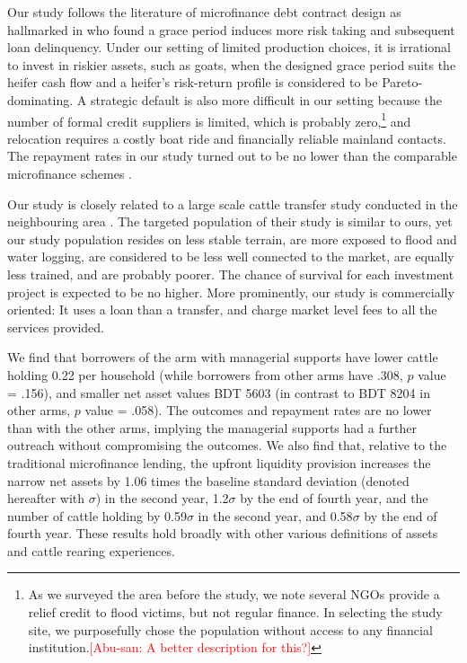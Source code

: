 	Our study follows the literature of microfinance debt contract design as hallmarked in \citet{Field2013} who found a grace period induces more risk taking and subsequent loan delinquency. Under our setting of limited production choices, it is irrational to invest in riskier assets, such as goats, when the designed grace period suits the heifer cash flow and a heifer's risk-return profile is considered to be Pareto-dominating. A strategic default is also more difficult in our setting because the number of formal credit suppliers is limited, which is probably zero,\footnote{As we surveyed the area before the study, we note several NGOs provide a relief credit to flood victims, but not regular finance. In selecting the study site, we purposefully chose the population without access to any financial institution.\textcolor{red}{[Abu-san: A better description for this?]} } and relocation requires a costly boat ride and financially reliable mainland contacts. The repayment rates in our study turned out to be no lower than the comparable microfinance schemes \citep{BanerjeeKarlanZinman2015}.

	Our study is closely related to a large scale cattle transfer study conducted in the neighbouring area \citep{BandieraBRAC2017, Balboni2020}. The targeted population of their study is similar to ours, yet our study population resides on less stable terrain, are more exposed to flood and water logging, are considered to be less well connected to the market, are equally less trained, and are probably poorer. The chance of survival for each investment project is expected to be no higher. More prominently, our study is commercially oriented: It uses a loan than a transfer, and charge market level fees to all the services provided. 
	



	We find that borrowers of the arm with managerial supports have lower cattle holding 0.22 per household (while borrowers from other arms have .308, $p$ value = .156), and smaller net asset values BDT 5603 (in contrast to BDT 8204 in other arms, $p$ value = .058). The outcomes and repayment rates are no lower than with the other arms, implying the managerial supports had a further outreach without compromising the outcomes. We also find that, relative to the traditional microfinance lending, the upfront liquidity provision increases the narrow net assets by 
	1.06 times the baseline standard deviation (denoted hereafter with $\sigma$) in the second year, 
	1.2$\sigma$ by the end of fourth year, 
	and the number of cattle holding by 0.59$\sigma$ in the second year, and 
	0.58$\sigma$ by the end of fourth year. 
	These results hold broadly with other various definitions of assets and cattle rearing experiences.

